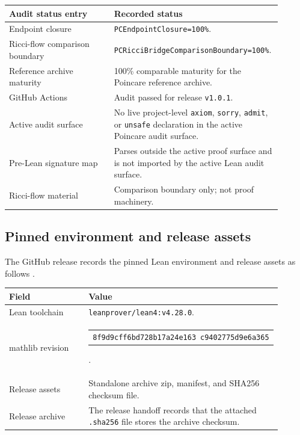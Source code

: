 \documentclass[11pt]{article}
\begin{document}
\begin{longtable}{L{0.38\linewidth}L{0.52\linewidth}}
\toprule
\textbf{Audit status entry} & \textbf{Recorded status}\\
\midrule
Endpoint closure & \texttt{PCEndpointClosure=100\%}.\\
Ricci-flow comparison boundary & \texttt{PCRicciBridgeComparisonBoundary=100\%}.\\
Reference archive maturity & 100\% comparable maturity for the Poincare reference archive.\\
GitHub Actions & Audit passed for release \texttt{v1.0.1}.\\
Active audit surface & No live project-level \texttt{axiom}, \texttt{sorry}, \texttt{admit}, or \texttt{unsafe} declaration in the active Poincare audit surface.\\
Pre-Lean signature map & Parses outside the active proof surface and is not imported by the active Lean audit surface.\\
Ricci-flow material & Comparison boundary only; not proof machinery.\\
\bottomrule
\end{longtable}

\subsection*{Pinned environment and release assets}
{}

The GitHub release records the pinned Lean environment and release assets as follows \cite{PoincareLeanAuditRelease2026}.

\begin{longtable}{L{0.32\linewidth}L{0.58\linewidth}}
\toprule
\textbf{Field} & \textbf{Value}\\
\midrule
Lean toolchain & \texttt{leanprover/lean4:v4.28.0}.\\
mathlib revision & \begin{tabular}[t]{@{}l@{}}\texttt{8f9d9cff6bd728b17a24e163}\
\texttt{c9402775d9e6a365}\end{tabular}.\\
Release assets & Standalone archive zip, manifest, and SHA256 checksum file.\\
Release archive & The release handoff records that the attached \texttt{.sha256} file stores the archive checksum.\\
\bottomrule
\end{longtable}
\end{document}
